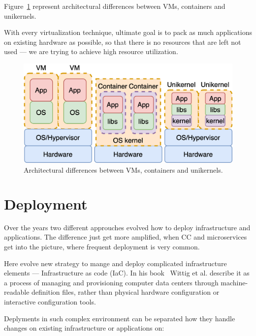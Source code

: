 Figure~\ref{fig:fig5} represent architectural differences between VMs, containers and unikernels.

With every virtualization technique, ultimate goal is to pack as much applications on existing hardware as possible, so that there is no resources that are left not used --- we are trying to achieve high resource utilization.

\begin{figure}[H]
	\begin{center}
		\includegraphics[scale=0.8]{images/Figure5.png}
	\end{center}
	\vspace{-0.6cm}
	\caption{Architectural differences between VMs, containers and unikernels.}
	\label{fig:fig5}
\end{figure}
%
%
\section{Deployment}\label{sec:deployment}
%
Over the years two different approuches evolved how to deploy infrastructure and applications. The difference just get more amplified, when CC and microservices get into the picture, where frequent deployment is very common. 

Here evolve new strategy to mange and deploy complicated infrastructure elements --- Infrastructure as code (IaC). In his book~\cite{wittig2018amazon} Wittig et al. describe it as a process of managing and provisioning computer data centers through machine-readable definition files, rather than physical hardware configuration or interactive configuration tools.

Deplyments in such complex environment can be separated how they handle changes on existing infrastructure or applications on:

